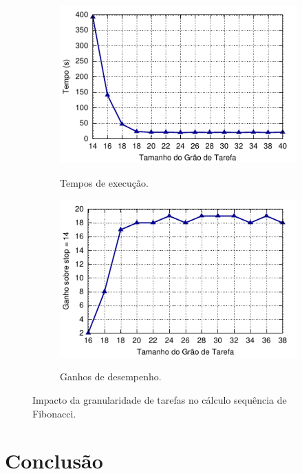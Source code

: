 \documentclass{SBCbookchapter}
\begin{document}
		\begin{figure}[b]
			\captionsetup[subfigure]{justification=centering}
			\centering
				\begin{subfigure}{0.45\linewidth}
					\includegraphics[width=\linewidth]{img/fibonacci-task-grain}
					\label{fig:grao-tarefas-tempo}
					\caption{Tempos de execução.}
				\end{subfigure}
				\quad
				\begin{subfigure}{0.45\linewidth}
					\includegraphics[width=\linewidth]{img/fibonacci-speedup}
					\label{fig:grao-tarefas-ganho}
					\caption{Ganhos de desempenho.}
				\end{subfigure}
			\caption{Impacto da granularidade de tarefas no cálculo sequência
				de Fibonacci.}
			\label{fig:grao-tarefas}
		\end{figure}

\section{Conclusão}
\label{sec:conclusao}
\end{document}
